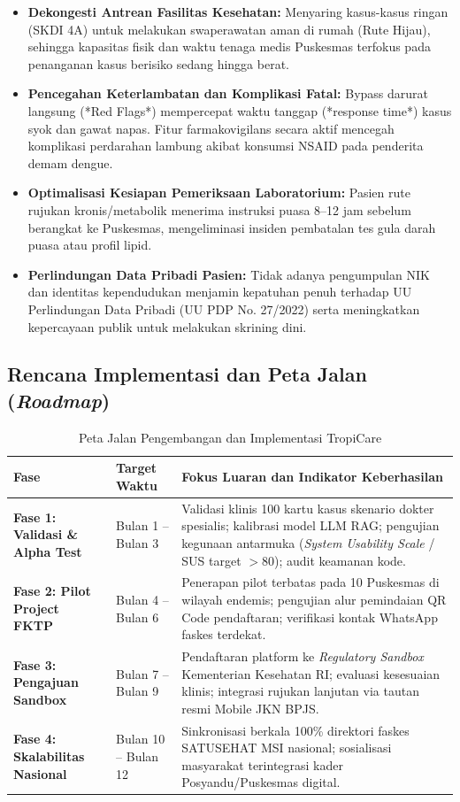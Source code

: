 \begin{itemize}
    \item \textbf{Dekongesti Antrean Fasilitas Kesehatan:} Menyaring kasus-kasus ringan (SKDI 4A) untuk melakukan swaperawatan aman di rumah (Rute Hijau), sehingga kapasitas fisik dan waktu tenaga medis Puskesmas terfokus pada penanganan kasus berisiko sedang hingga berat.
    \item \textbf{Pencegahan Keterlambatan dan Komplikasi Fatal:} Bypass darurat langsung (*Red Flags*) mempercepat waktu tanggap (*response time*) kasus syok dan gawat napas. Fitur farmakovigilans secara aktif mencegah komplikasi perdarahan lambung akibat konsumsi NSAID pada penderita demam dengue.
    \item \textbf{Optimalisasi Kesiapan Pemeriksaan Laboratorium:} Pasien rute rujukan kronis/metabolik menerima instruksi puasa 8--12 jam sebelum berangkat ke Puskesmas, mengeliminasi insiden pembatalan tes gula darah puasa atau profil lipid.
    \item \textbf{Perlindungan Data Pribadi Pasien:} Tidak adanya pengumpulan NIK dan identitas kependudukan menjamin kepatuhan penuh terhadap UU Perlindungan Data Pribadi (UU PDP No. 27/2022) serta meningkatkan kepercayaan publik untuk melakukan skrining dini.
\end{itemize}

\subsection{Rencana Implementasi dan Peta Jalan (\textit{Roadmap})}

\begin{table}[H]
\centering
\small
\begin{tabularx}{\textwidth}{p{2.2cm} p{4cm} X}
\toprule
\textbf{Fase} & \textbf{Target Waktu} & \textbf{Fokus Luaran dan Indikator Keberhasilan} \\
\midrule
\textbf{Fase 1: Validasi \& Alpha Test} & Bulan 1 -- Bulan 3 & Validasi klinis 100 kartu kasus skenario dokter spesialis; kalibrasi model LLM RAG; pengujian kegunaan antarmuka (\textit{System Usability Scale} / SUS target $>80$); audit keamanan kode. \\
\textbf{Fase 2: Pilot Project FKTP} & Bulan 4 -- Bulan 6 & Penerapan pilot terbatas pada 10 Puskesmas di wilayah endemis; pengujian alur pemindaian QR Code pendaftaran; verifikasi kontak WhatsApp faskes terdekat. \\
\textbf{Fase 3: Pengajuan Sandbox} & Bulan 7 -- Bulan 9 & Pendaftaran platform ke \textit{Regulatory Sandbox} Kementerian Kesehatan RI; evaluasi kesesuaian klinis; integrasi rujukan lanjutan via tautan resmi Mobile JKN BPJS. \\
\textbf{Fase 4: Skalabilitas Nasional} & Bulan 10 -- Bulan 12 & Sinkronisasi berkala 100\% direktori faskes SATUSEHAT MSI nasional; sosialisasi masyarakat terintegrasi kader Posyandu/Puskesmas digital. \\
\bottomrule
\end{tabularx}
\caption{Peta Jalan Pengembangan dan Implementasi TropiCare}
\label{tab:roadmap}
\end{table}
